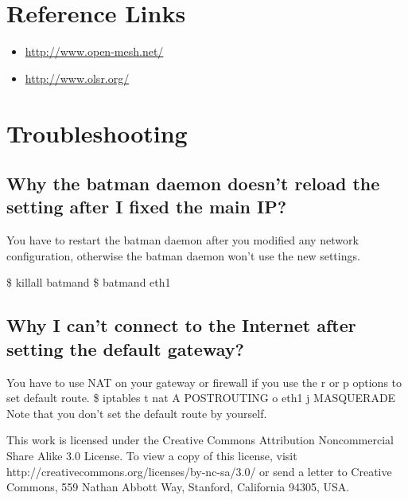 \documentclass[
	12pt,
	a4paper,
	twoside,
	english,
	headsepline,
	footnosepline,
	automark,
	normalheadings,
	openany,
	cleardoubleplain,
	abstracton,
	idxtotoc,
	liststotoc,
	bibtotoc,
 	BCOR8mm,
]{scrartcl}
\begin{document}
\section{Reference Links}
\begin{itemize}
\item \url{http://www.open-mesh.net/}
\item \url{http://www.olsr.org/}
\end{itemize}

\section{Troubleshooting}
\subsection{Why the batman daemon doesn't reload the setting after I fixed the main IP?}
You have to restart the batman daemon after you modified any network configuration,  otherwise the batman daemon won't use the new settings.

\$ killall batmand   \$ batmand eth1

\subsection{Why I can't connect to the Internet after setting the default gateway?}
You have to use NAT on your gateway or firewall if you use the  r or  p options to set default  route. \$ iptables  t nat  A POSTROUTING  o eth1  j MASQUERADE Note that you don't set the default route by yourself.

This work is licensed under the Creative Commons Attribution Noncommercial Share Alike 3.0 License. To 
view a copy of this license, visit http://creativecommons.org/licenses/by-nc-sa/3.0/ or send a letter to Creative  Commons, 559 Nathan Abbott Way, Stanford, California 94305, USA.
\end{document}
